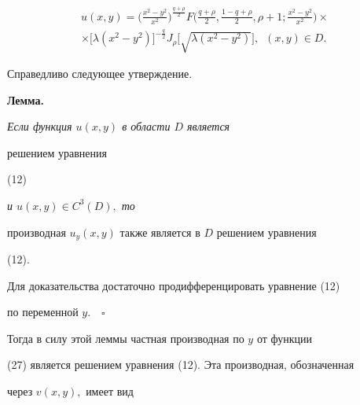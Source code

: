 \begin{multline}


u(x,y)=


\bigg(\frac{x^2-y^2}{x^2}\bigg)^{{\frac{q+\rho}{2}}}F


\bigg(\frac{q+\rho}{2},\frac{1-q+\rho}{2},\rho+1;


\frac{x^2-y^2}{x^2}\bigg)\times \\


%


\times\big[\lambda (x^2-y^2)\big]^{{-\frac{q}{2}}}J_\rho


\big[\sqrt{\lambda (x^2-y^2)}\big],\ \; (x,y) \in D.


\end{multline}





Справедливо следующее утверждение.


\medskip





{\bf Лемма.} {\it Если функция $u(x,y) $ в области $D$ является


решением уравнения} (12) {\it и $u(x,y)\in C^3(D),$ то


производная $u_y(x,y)$ также является в $D$ решением уравнения}


(12).


\medskip





Для доказательства достаточно продифференцировать уравнение (12)


по переменной $y.\quad\square$





Тогда в силу этой леммы частная производная по $y$  от функции


(27) является  решением уравнения (12). Эта производная, обозначенная


через $v(x,y),$ имеет вид



